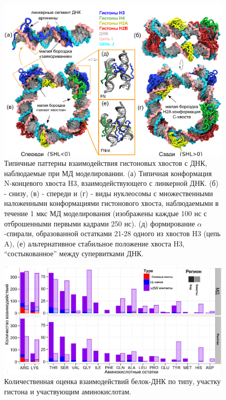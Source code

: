 \begin{figure} [H]
    \centering
    \includegraphics[width=\textwidth]{images/p2/jmb/part2_2_f6.pdf}
    \caption[Типичные паттерны взаимодействия гистоновых хвостов с ДНК]{Типичные паттерны взаимодействия гистоновых хвостов с ДНК, наблюдаемые при МД моделировании. (а) Типичная конформация N-концевого хвоста H3, взаимодействующего с линкерной ДНК. (б) - снизу, (в) - спереди и (г) - виды нуклеосомы с множественными наложенными конформациями гистонового хвоста, наблюдаемыми в течение 1 мкс МД моделирования (изображены каждые 100 нс с отброшенными первыми кадрами 250 нс). (д) формирование $\alpha$-спирали, образованной остатками 21-28 одного из хвостов H3 (цепь A), (е) альтернативное стабильное положение хвоста H3, ``состыкованное'' между супервитками ДНК.}
    \label{fig:p2_2_f6}
\end{figure}

\begin{figure} [H]
    \centering
    \includegraphics[width=\textwidth]{images/p2/jmb/part2_2_f7.pdf}
    \caption[Взаимодействия белок-ДНК в нуклеосоме]{Количественная оценка взаимодействий белок-ДНК по типу, участку гистона и участвующим аминокислотам.}
    \label{fig:p2_2_f7}
\end{figure}


